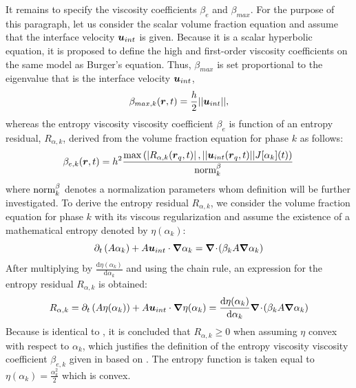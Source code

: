 It remains to specify the viscosity coefficients $\beta_e$ and $\beta_{max}$. For the purpose of this paragraph, let us consider the scalar volume fraction equation and assume that the interface velocity $\boldsymbol u_{int}$ is given. Because it is a scalar hyperbolic equation, it is proposed to define the high and first-order viscosity coefficients on the same model as Burger's equation. Thus, $\beta_{max}$ is set proportional to the eigenvalue that is the interface velocity $\boldsymbol u_{int}$,
%
\begin{equation}\label{eq:def-beta-max-sen-sect4}
\beta_{max,k}( \boldsymbol r, t) = \frac{h}{2} || \boldsymbol u_{int} ||,
\end{equation}
%
whereas the entropy viscosity viscosity coefficient $\beta_e$ is function of an entropy residual, $R_{\alpha,k}$, derived from the volume fraction equation for phase $k$ as follows:
%
\begin{align}\label{eq:def-beta-sen-sect4}
\beta_{e,k}( \boldsymbol r, t) = h^2 \frac{\max\left( | R_{\alpha,k}(\boldsymbol r_q,t) |\,, || \boldsymbol u_{int}(\boldsymbol r_q,t) || J[\alpha_k](t) \right)}{\textrm{norm}_{k}^\beta} \,
\end{align}
%
where $\textrm{norm}_{k}^\beta$ denotes a normalization parameters whom definition will be further investigated. To derive the entropy residual $R_{\alpha,k}$, we consider the volume fraction equation for phase $k$ with its viscous regularization and assume the existence of a mathematical entropy denoted by $\eta(\alpha_k)$:
%
\begin{equation}\label{eq:vf-sem-sct4}
\partial_t \left(A \alpha_k \right) + A \boldsymbol u_{int} \cdot \boldsymbol{\nabla} \alpha_k = \boldsymbol{\nabla}\! \cdot \! \left( \beta_k A \boldsymbol{\nabla} \alpha_k \right)
\end{equation}
% 
After multiplying by $\frac{\text{d} \eta (\alpha_k)}{\text{d} \alpha_k}$ and using the chain rule, an expression for the entropy residual $R_{\alpha,k}$ is obtained:
%
\begin{equation}\label{eq:vf-sem2-sct4}
R_{\alpha,k} = \partial_t \left(A \eta(\alpha_k) \right) + A \boldsymbol u_{int} \cdot \boldsymbol{\nabla} \eta(\alpha_k) = \frac{\text{d} \eta (\alpha_k)}{\text{d} \alpha_k} \boldsymbol{\nabla}\! \cdot \! \left( \beta_k A \boldsymbol{\nabla} \alpha_k \right)
\end{equation}
% 
Because  is identical to , it is concluded that $R_{\alpha,k} \geq 0$ when assuming $\eta$ convex with respect to $\alpha_k$, which justifies the definition of the entropy viscosity viscosity coefficient $\beta_{e,k}$ given in  based on . The entropy function is taken equal to $\eta(\alpha_k) = \frac{\alpha_k^2}{2}$ which is convex.
